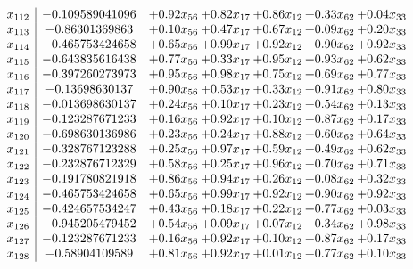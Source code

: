 \documentclass[8pt]{article}
\begin{document}
\[\begin{array}{c| c c@{\hskip 2pt} c@{\hskip 2pt} c@{\hskip 2pt} c@{\hskip 2pt} c@{\hskip 2pt} }
 x_{112}   &  -0.109589041096 & +  0.92 x_{56} & +  0.82 x_{17} & +  0.86 x_{12} & +  0.33 x_{62} & +  0.04 x_{33}\\
 x_{113}   &  -0.86301369863 & +  0.10 x_{56} & +  0.47 x_{17} & +  0.67 x_{12} & +  0.09 x_{62} & +  0.20 x_{33}\\
 x_{114}   &  -0.465753424658 & +  0.65 x_{56} & +  0.99 x_{17} & +  0.92 x_{12} & +  0.90 x_{62} & +  0.92 x_{33}\\
 x_{115}   &  -0.643835616438 & +  0.77 x_{56} & +  0.33 x_{17} & +  0.95 x_{12} & +  0.93 x_{62} & +  0.62 x_{33}\\
 x_{116}   &  -0.397260273973 & +  0.95 x_{56} & +  0.98 x_{17} & +  0.75 x_{12} & +  0.69 x_{62} & +  0.77 x_{33}\\
 x_{117}   &  -0.13698630137 & +  0.90 x_{56} & +  0.53 x_{17} & +  0.33 x_{12} & +  0.91 x_{62} & +  0.80 x_{33}\\
 x_{118}   &  -0.013698630137 & +  0.24 x_{56} & +  0.10 x_{17} & +  0.23 x_{12} & +  0.54 x_{62} & +  0.13 x_{33}\\
 x_{119}   &  -0.123287671233 & +  0.16 x_{56} & +  0.92 x_{17} & +  0.10 x_{12} & +  0.87 x_{62} & +  0.17 x_{33}\\
 x_{120}   &  -0.698630136986 & +  0.23 x_{56} & +  0.24 x_{17} & +  0.88 x_{12} & +  0.60 x_{62} & +  0.64 x_{33}\\
 x_{121}   &  -0.328767123288 & +  0.25 x_{56} & +  0.97 x_{17} & +  0.59 x_{12} & +  0.49 x_{62} & +  0.62 x_{33}\\
 x_{122}   &  -0.232876712329 & +  0.58 x_{56} & +  0.25 x_{17} & +  0.96 x_{12} & +  0.70 x_{62} & +  0.71 x_{33}\\
 x_{123}   &  -0.191780821918 & +  0.86 x_{56} & +  0.94 x_{17} & +  0.26 x_{12} & +  0.08 x_{62} & +  0.32 x_{33}\\
 x_{124}   &  -0.465753424658 & +  0.65 x_{56} & +  0.99 x_{17} & +  0.92 x_{12} & +  0.90 x_{62} & +  0.92 x_{33}\\
 x_{125}   &  -0.424657534247 & +  0.43 x_{56} & +  0.18 x_{17} & +  0.22 x_{12} & +  0.77 x_{62} & +  0.03 x_{33}\\
 x_{126}   &  -0.945205479452 & +  0.54 x_{56} & +  0.09 x_{17} & +  0.07 x_{12} & +  0.34 x_{62} & +  0.98 x_{33}\\
 x_{127}   &  -0.123287671233 & +  0.16 x_{56} & +  0.92 x_{17} & +  0.10 x_{12} & +  0.87 x_{62} & +  0.17 x_{33}\\
 x_{128}   &  -0.58904109589 & +  0.81 x_{56} & +  0.92 x_{17} & +  0.01 x_{12} & +  0.77 x_{62} & +  0.10 x_{33}\\

\end{array}\]
\end{document}
